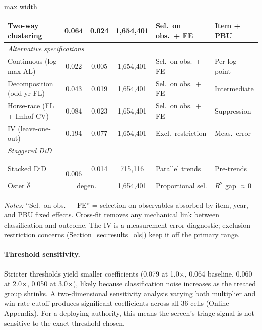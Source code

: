 \begin{table}[htbp]
\begin{adjustbox}{max width=\textwidth}
\begin{tabular}{lcccp{3.2cm}l}
Two-way clustering & 0.064 & 0.024 & 1{,}654{,}401 & Sel.\ on obs.\ + FE & Item + PBU \\
\hline
\multicolumn{6}{l}{\textit{Alternative specifications}} \\
Continuous (log max AL) & 0.022 & 0.005 & 1{,}654{,}401 & Sel.\ on obs.\ + FE & Per log-point \\
Decomposition (odd-yr FL) & 0.043 & 0.019 & 1{,}654{,}401 & Sel.\ on obs.\ + FE & Intermediate \\
Horse-race (FL + Imhof CV) & 0.084 & 0.023 & 1{,}654{,}401 & Sel.\ on obs.\ + FE & Suppression \\
IV (leave-one-out) & 0.194 & 0.077 & 1{,}654{,}401 & Excl.\ restriction & Meas.\ error \\
\hline
\multicolumn{6}{l}{\textit{Staggered DiD}} \\
Stacked DiD & $-$0.006 & 0.014 & 715{,}116 & Parallel trends & Pre-trends \\
Oster $\hat{\delta}$ & \multicolumn{2}{c}{degen.} & 1{,}654{,}401 & Proportional sel. & $R^2$ gap $\approx 0$ \\
\hline\hline
\end{tabular}
\end{adjustbox}
\begin{tablenotes}
\footnotesize
\item \textit{Notes:} ``Sel.\ on obs.\ + FE'' = selection on observables absorbed by item, year, and PBU fixed effects. Cross-fit removes any mechanical link between classification and outcome. The IV is a measurement-error diagnostic; exclusion-restriction concerns (Section~\ref{sec:results_ols}) keep it off the primary range.
\end{tablenotes}
\end{table}


\paragraph{Threshold sensitivity.}
Stricter thresholds yield smaller coefficients (0.079 at
1.0$\times$, 0.064 baseline, 0.060 at 2.0$\times$, 0.050 at
3.0$\times$), likely because classification noise increases as the
treated group shrinks. A two-dimensional sensitivity analysis varying
both multiplier and win-rate cutoff produces significant coefficients
across all 36 cells
(Online Appendix).
For a deploying authority, this means the screen's triage signal is
not sensitive to the exact threshold chosen.

